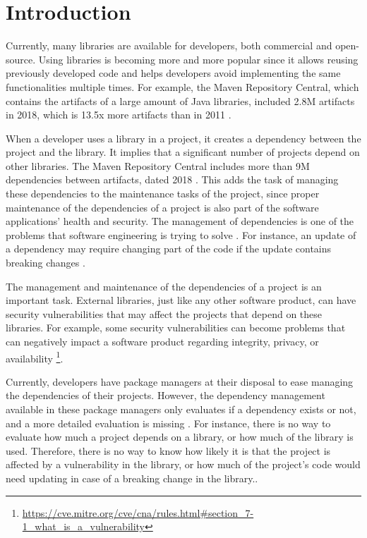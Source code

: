 \chapter{Introduction}\label{ch:Introduction}

Currently, many libraries are available for developers, both commercial and open-source. Using libraries is becoming more and more popular \cite{kikas2017structure} since it allows reusing previously developed code and helps developers avoid implementing the same functionalities multiple times. For example, the Maven Repository Central, which contains the artifacts of a large amount of Java libraries, included 2.8M artifacts in 2018, which is 13.5x more artifacts than in 2011  \cite{Benelallam2019}.

When a developer uses a library in a project, it creates a dependency between the project and the library. It implies that a significant number of projects depend on other libraries. The Maven Repository Central includes more than 9M dependencies between artifacts, dated 2018 \cite{Benelallam2019}. This adds the task of managing these dependencies to the maintenance tasks of the project, since proper maintenance of the dependencies of a project is also part of the software applications' health and security. The management of dependencies is one of the problems that software engineering is trying to solve \cite{kula2014visualizing}. For instance, an update of a dependency may require changing part of the code if the update contains breaking changes \cite{Raemaekers2017}.

The management and maintenance of the dependencies of a project is an important task. External libraries, just like any other software product, can have security vulnerabilities that may affect the projects that depend on these libraries. For example, some security vulnerabilities can become problems that can negatively impact a software product regarding integrity, privacy, or availability \footnote{\url{https://cve.mitre.org/cve/cna/rules.html\#section_7-1_what_is_a_vulnerability}}.

\blankl
Currently, developers have package managers at their disposal to ease managing the dependencies of their projects. However, the dependency management available in these package managers only evaluates if a dependency exists or not, and a more detailed evaluation is missing \cite{hejderup2018prazi}. For instance, there is no way to evaluate how much a project depends on a library, or how much of the library is used. Therefore, there is no way to know how likely it is that the project is affected by a vulnerability in the library, or how much of the project's code would need updating in case of a breaking change in the library..

